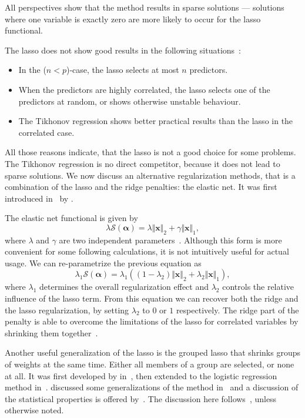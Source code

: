 All perspectives show that the method results in sparse solutions --- 
solutions where one variable is exactly zero are more likely to occur for the
lasso functional.

The lasso does not show good results in the following situations~\cite{elasticnet}:
\begin{itemize}
\item In the (\(n < p\))-case, the lasso selects at most \(n\) predictors.
\item When the predictors are highly correlated, the lasso selects one of the
  predictors at random, or shows otherwise unstable behaviour.
\item The Tikhonov regression shows better practical results than the lasso in the
  correlated case.
\end{itemize}
All those reasons indicate, that the lasso is not a good choice for some problems.
The Tikhonov regression is no direct competitor, because it does not lead to
sparse solutions.
We now discuss an alternative regularization methods, that is a combination of the lasso and the ridge penalties: the elastic net.
It was first introduced in~\cite{elasticnet} by \citeauthor{elasticnet}.

The elastic net functional is given by
\begin{equation}
  \label{eq:elastic-net}
  \lambda \mathcal{S}(\bm{\alpha}) = \lambda \Vert \bm{x} \Vert_2 +  \gamma \Vert \bm{x} \Vert _1,
\end{equation}
where \(\lambda\) and \(\gamma\) are two independent parameters~\cite{elasticnet}.
Although this form is more convenient for some following calculations, it is not intuitively useful for actual usage.
We can re-parametrize the previous equation as
\begin{equation*}
  \lambda_1 \mathcal{S}(\bm{\alpha}) = \lambda_1 \left( \left(1 - \lambda_2 \right) \Vert \bm{x} \Vert_2  + \lambda_2 \Vert \bm{x} \Vert _1\right),
\end{equation*}
where \(\lambda_1\) determines the overall regularization effect and \(\lambda_2\) controls the relative influence of the lasso term.
From this equation we can recover both the ridge and the lasso regularization, by setting \(\lambda_2\) to \(0\) or \(1\) respectively.
The ridge part of the penalty is able to overcome the limitations of the lasso
for correlated variables by shrinking them together~\cite{elasticnet}.

Another useful generalization of the lasso is the grouped lasso that shrinks groups of weights at the same time.
Either all members of a group are selected, or none at all.
It was first developed by \citeauthor{grouplasso} in~\cite{grouplasso}, then
extended to the logistic regression method in~\cite{grouplasso-logistic}.
\citeauthor{grouplasso-generalizations} discussed some generalizations of the
method in~\cite{grouplasso-generalizations} and a discussion of the statistical
properties is offered by~\cite{grouplasso-benefit}.
The discussion here follows~\cite{sparse-learning}, unless otherwise noted.

